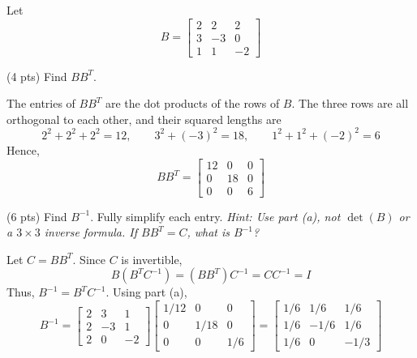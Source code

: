 \documentclass[11pt]{article}
\begin{document}
\begin{prob}[(10 pts)]
Let
\[
B=\begin{bmatrix}2&2&2\\3&-3&0\\1&1&-2\end{bmatrix}
\]
\begin{subprob}(4 pts)
Find $BB^T$. \\

\begin{solution}
The entries of $BB^T$ are the dot products of the rows of $B$. The three rows are all orthogonal to each other, and their squared lengths are
\[
2^2+2^2+2^2=12,\qquad 3^2+(-3)^2=18,\qquad 1^2+1^2+(-2)^2=6
\]
Hence,
\[
\boxed{BB^T=\begin{bmatrix}12&0&0\\0&18&0\\0&0&6\end{bmatrix}}
\]
\end{solution}
\end{subprob}
\begin{subprob}(6 pts)
Find $B^{-1}$. Fully simplify each entry. \textit{Hint: Use part (a), not $\det(B)$ or a $3\times3$ inverse formula. If $BB^T=C$, what is $B^{-1}$?}\par\vspace{0.2em}

\begin{solution}
Let $C=BB^T$. Since $C$ is invertible,
\[
B(B^TC^{-1})=(BB^T)C^{-1}=CC^{-1}=I
\]
Thus, $B^{-1}=B^TC^{-1}$. Using part (a),
\[
B^{-1}
=\begin{bmatrix}2&3&1\\2&-3&1\\2&0&-2\end{bmatrix}
\begin{bmatrix}1/12&0&0\\0&1/18&0\\0&0&1/6\end{bmatrix}
=\boxed{\begin{bmatrix}1/6&1/6&1/6\\1/6&-1/6&1/6\\1/6&0&-1/3\end{bmatrix}}
\]
\end{solution}
\end{subprob}
\end{prob}
\newpage
\end{document}
